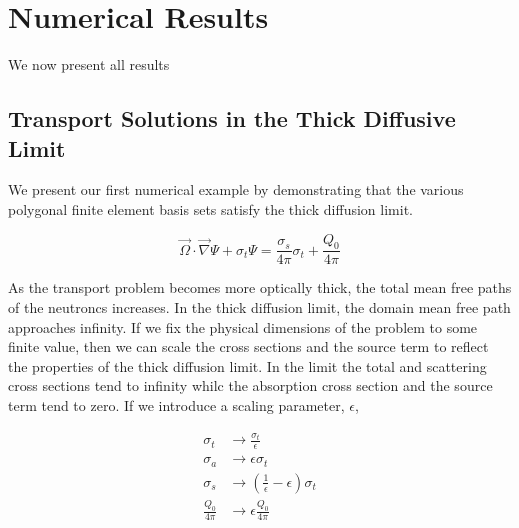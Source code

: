 \section{Numerical Results}
\label{sec::DSA_Results}

We now present all results 

\subsection{Transport Solutions in the Thick Diffusive Limit}
\label{sec::DSA_Results_TDL}

We present our first numerical example by demonstrating that the various polygonal finite element basis sets satisfy the thick diffusion limit. 

\begin{equation}
\label{eq::BF_Results_TDL_trans_eq}
\vec{\Omega} \cdot \vec{\nabla} \Psi + \sigma_t \Psi =   \frac{\sigma_s}{4 \pi} \sigma_t +  \frac{Q_0}{4 \pi}
\end{equation}

\noindent As the transport problem becomes more optically thick, the total mean free paths of the neutroncs increases. In the thick diffusion limit, the domain mean free path approaches infinity. If we fix the physical dimensions of the problem to some finite value, then we can scale the cross sections and the source term to reflect the properties of the thick diffusion limit. In the limit the total and scattering cross sections tend to infinity whilc the absorption cross section and the source term tend to zero. If we introduce a scaling parameter, $\epsilon$, 

\begin{equation}
\label{eq::BF_Results_TDL_scaling}
\begin{aligned}
	\sigma_t &\rightarrow \frac{\sigma_t}{\epsilon} \\
	\sigma_a &\rightarrow \epsilon \sigma_t\\
	\sigma_s &\rightarrow \left( \frac{1}{\epsilon} - \epsilon   \right) \sigma_t \\
	\frac{Q_0}{4 \pi} &\rightarrow \epsilon \frac{Q_0}{4 \pi}
\end{aligned}
\end{equation}

